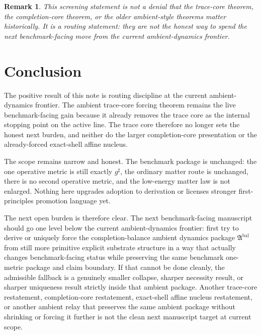 \documentclass[11pt]{article}
\newcommand{\CompletedMetric}{g^{\sharp}}
\newcommand{\AmbientPackage}{\mathfrak A^{\mathrm{bal}}}
\newtheorem{remark}{Remark}
\begin{document}
\begin{remark}
This screening statement is not a denial that the trace-core theorem, the completion-core theorem, or the older ambient-style theorems matter historically. It is a routing statement: they are not the honest way to spend the next benchmark-facing move from the current ambient-dynamics frontier.
\end{remark}

\section{Conclusion}

The positive result of this note is routing discipline at the current ambient-dynamics frontier. The ambient trace-core forcing theorem remains the live benchmark-facing gain because it already removes the trace core as the internal stopping point on the active line. The trace core therefore no longer sets the honest next burden, and neither do the larger completion-core presentation or the already-forced exact-shell affine nucleus.

The scope remains narrow and honest. The benchmark package is unchanged: the one operative metric is still exactly \(\CompletedMetric\), the ordinary matter route is unchanged, there is no second operative metric, and the low-energy matter law is not enlarged. Nothing here upgrades adoption to derivation or licenses stronger first-principles promotion language yet.

The next open burden is therefore clear. The next benchmark-facing manuscript should go one level below the current ambient-dynamics frontier: first try to derive or uniquely force the completion-balance ambient dynamics package \(\AmbientPackage\) from still more primitive explicit substrate structure in a way that actually changes benchmark-facing status while preserving the same benchmark one-metric package and claim boundary. If that cannot be done cleanly, the admissible fallback is a genuinely smaller collapse, sharper necessity result, or sharper uniqueness result strictly inside that ambient package. Another trace-core restatement, completion-core restatement, exact-shell affine nucleus restatement, or another ambient relay that preserves the same ambient package without shrinking or forcing it further is not the clean next manuscript target at current scope.
\end{document}
